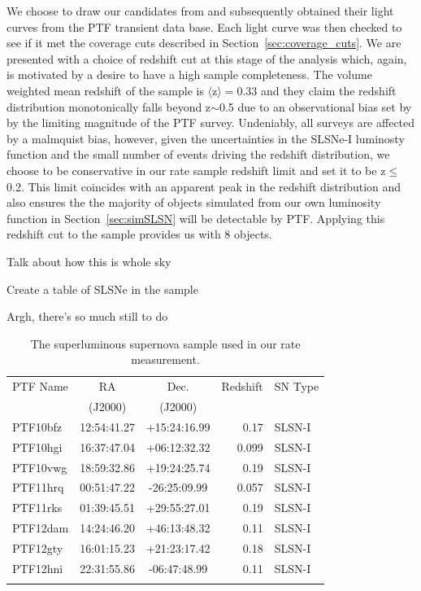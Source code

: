 \documentclass[a4paper,fleqn,usenatbib]{mnras}
\newcommand{\chris}[1]{\color{orange}#1\color{black}}
\begin{document}
We choose to draw our candidates from \citet[][Table 1.]{DeCia2017} and subsequently obtained their light curves from the PTF transient data base. Each light curve was then checked to see if it met the coverage cuts described in Section~\ref{sec:coverage_cuts}. We are presented with a choice of redshift cut at this stage of the analysis which, again, is motivated by a desire to have a high sample completeness. The volume weighted mean redshift of the \citet{DeCia2017} sample is $\langle \mathrm{z} \rangle = 0.33$ and they claim the redshift distribution monotonically falls beyond z${\sim}$0.5 due to an observational bias set by by the limiting magnitude of the PTF survey. Undeniably, all surveys are affected by a malmquist bias, however, given the uncertainties in the SLSNe-I luminosty function and the small number of events driving the redshift distribution, we choose to be conservative in our rate sample redshift limit and set it to be z${\le}$0.2. This limit coincides with an apparent peak in the \citet{DeCia2017} redshift distribution and also ensures the the majority of objects simulated from our own luminosity function in Section~\ref{sec:simSLSN} will be detectable by PTF. Applying this redshift cut to the \citet{DeCia2017} sample provides us with 8 objects.

Talk about how this is whole sky

Create a table of SLSNe in the sample

\chris{Argh, there's so much still to do}

\begin{table}
    \caption{The superluminous supernova sample used in our rate measurement.}
    \begin{center}
    \begin{tabular}{lccrl}
        \hline
    PTF Name & RA & Dec. & Redshift & SN Type \\
             & (J2000) & (J2000) & & \\
        \hline
    PTF10bfz & 12:54:41.27 & +15:24:16.99 & 0.17 & SLSN-I \\
    PTF10hgi & 16:37:47.04 & +06:12:32.32 & 0.099 & SLSN-I \\
    PTF10vwg & 18:59:32.86 & +19:24:25.74 & 0.19 & SLSN-I \\
    PTF11hrq & 00:51:47.22 & -26:25:09.99 & 0.057 & SLSN-I \\
    PTF11rks & 01:39:45.51 & +29:55:27.01 & 0.19 & SLSN-I \\
    PTF12dam & 14:24:46.20 & +46:13:48.32 & 0.11 & SLSN-I \\
    PTF12gty & 16:01:15.23 & +21:23:17.42 & 0.18 & SLSN-I \\
    PTF12hni & 22:31:55.86 & -06:47:48.99 & 0.11 & SLSN-I \\
    \hline
		\label{tab:slsn_properties}
    \end{tabular}
    \end{center}
    \end{table}
\end{document}
